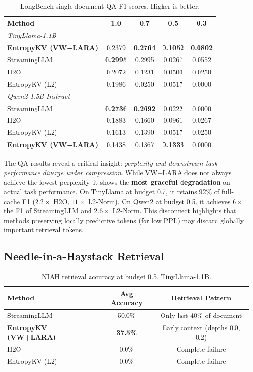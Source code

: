 \documentclass{article}
\begin{document}
\begin{table}[h]
\centering
\caption{LongBench single-document QA F1 scores. Higher is better.}
\label{tab:qa}
\begin{tabular}{lcccc}
\toprule
\textbf{Method} & \textbf{1.0} & \textbf{0.7} & \textbf{0.5} & \textbf{0.3} \\
\midrule
\multicolumn{5}{l}{\textit{TinyLlama-1.1B}} \\
\midrule
\textbf{EntropyKV (VW+LARA)} & 0.2379 & \textbf{0.2764} & \textbf{0.1052} & \textbf{0.0802} \\
StreamingLLM & \textbf{0.2995} & 0.2995 & 0.0267 & 0.0552 \\
H2O & 0.2072 & 0.1231 & 0.0500 & 0.0250 \\
EntropyKV (L2) & 0.1986 & 0.0250 & 0.0517 & 0.0000 \\
\midrule
\multicolumn{5}{l}{\textit{Qwen2-1.5B-Instruct}} \\
\midrule
StreamingLLM & \textbf{0.2736} & \textbf{0.2692} & 0.0222 & 0.0000 \\
H2O & 0.1883 & 0.1660 & 0.0961 & 0.0267 \\
EntropyKV (L2) & 0.1613 & 0.1390 & 0.0517 & 0.0250 \\
\textbf{EntropyKV (VW+LARA)} & 0.1438 & 0.1367 & \textbf{0.1333} & 0.0000 \\
\bottomrule
\end{tabular}
\end{table}

The QA results reveal a critical insight: \emph{perplexity and downstream task performance diverge under compression}. While VW+LARA does not always achieve the lowest perplexity, it shows the \textbf{most graceful degradation} on actual task performance. On TinyLlama at budget 0.7, it retains 92\% of full-cache F1 ($2.2\times$ H2O, $11\times$ L2-Norm). On Qwen2 at budget 0.5, it achieves $6\times$ the F1 of StreamingLLM and $2.6\times$ L2-Norm. This disconnect highlights that methods preserving locally predictive tokens (for low PPL) may discard globally important retrieval tokens.

\subsection{Needle-in-a-Haystack Retrieval}

\begin{table}[h]
\centering
\caption{NIAH retrieval accuracy at budget 0.5. TinyLlama-1.1B.}
\label{tab:niah}
\begin{tabular}{lcc}
\toprule
\textbf{Method} & \textbf{Avg Accuracy} & \textbf{Retrieval Pattern} \\
\midrule
StreamingLLM & 50.0\% & Only last 40\% of document \\
\textbf{EntropyKV (VW+LARA)} & \textbf{37.5\%} & Early context (depths 0.0, 0.2) \\
H2O & 0.0\% & Complete failure \\
EntropyKV (L2) & 0.0\% & Complete failure \\
\bottomrule
\end{tabular}
\end{table}
\end{document}

